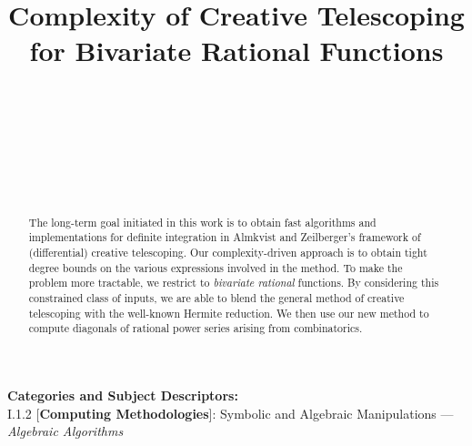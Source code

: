 \documentclass{sig-alt-full}
\begin{document}
\crdata{}

\title{Complexity of Creative Telescoping\\ for Bivariate Rational Functions}
\def\more-auths{\end{tabular}
\begin{tabular}{c}}
\author{
\\
\\
\\
\\
\\
\\
}

\maketitle
\begin{abstract}
The long-term goal initiated in this work is to obtain fast
algorithms and implementations for definite integration in
Almkvist and Zeilberger's framework of (differential)
creative telescoping.
Our complexity-driven approach is to
obtain tight degree bounds on the various expressions
involved in the method. To make the
problem more tractable, we restrict
to \emph{bivariate rational\/} functions. By considering this
constrained class of inputs, we are able to blend the general method
of creative telescoping with the well-known Hermite reduction. We
then use our new method to compute diagonals of rational power series
arising from combinatorics.
\end{abstract}

\vspace{1mm}
\noindent
{\bf Categories and Subject Descriptors:} \\
\noindent I.1.2 [{\bf Computing Methodologies}]: Symbolic and
Algebraic Manipulations --- \emph{Algebraic Algorithms}
\end{document}
